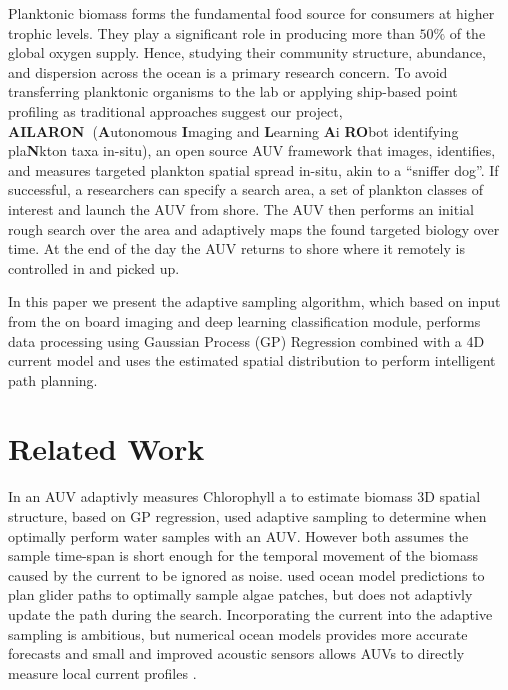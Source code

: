 \documentclass[conference]{IEEEtran}
\def\proj{{\textbf{AILARON\ }}}
\begin{document}
Planktonic biomass forms the fundamental food source for consumers at
higher trophic levels. They play a significant role in producing more
than $50\%$ of the global oxygen supply. Hence, studying their
community structure, abundance, and dispersion across the ocean is a
primary research concern. To avoid transferring planktonic organisms
to the lab or applying ship-based point profiling as traditional
approaches suggest our project, \proj (\textbf{A}utonomous
\textbf{I}maging and \textbf{L}earning \textbf{A}i \textbf{RO}bot
identifying pla\textbf{N}kton taxa in-situ), an open source AUV
framework that images, identifies, and measures targeted plankton
spatial spread in-situ, akin to a ``sniffer dog''. If successful,
a researchers can specify a search area, a set of plankton classes of interest and launch the AUV from shore. The AUV then performs an initial rough search over the area and adaptively maps the found targeted biology over time. At the end of the
day the AUV returns to shore where it remotely is controlled in and picked up.

In this paper we present the adaptive sampling algorithm, which based
on input from the on board imaging and deep learning classification
module, performs data processing using Gaussian Process (GP)
Regression combined with a 4D current model and uses the estimated
spatial distribution to perform intelligent path planning.


\section{Related Work}

In \cite{fossum18b} an AUV adaptivly measures Chlorophyll a to
estimate biomass 3D spatial structure, based on GP regression,
\cite{das15} used adaptive sampling to determine when optimally
perform water samples with an AUV.  However both assumes the sample
time-span is short enough for the temporal movement of the biomass
caused by the current to be ignored as noise.  \cite{smith10} used
ocean model predictions to plan glider paths to optimally sample algae
patches, but does not adaptivly update the path during the search.
Incorporating the current into the adaptive sampling is ambitious, but
numerical ocean models provides more accurate forecasts and small and
improved acoustic sensors allows AUVs to directly measure local
current profiles \cite{Fong2006, Cusi2017}.
\end{document}

